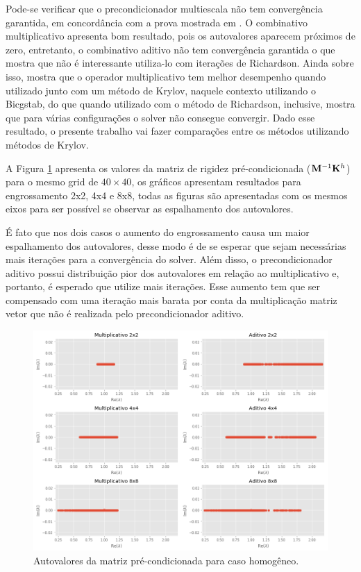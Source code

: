 Pode-se verificar que o precondicionador multiescala não tem convergência garantida, em concordância com a prova mostrada em \cite{zhouiterativo}. O combinativo multiplicativo apresenta bom resultado, pois os autovalores aparecem próximos de zero, entretanto, o combinativo aditivo não tem convergência garantida o que mostra que não é interessante utiliza-lo com iterações de Richardson. Ainda sobre isso, \cite{casteletto} mostra que o operador multiplicativo tem melhor desempenho quando utilizado junto com um método de Krylov, naquele contexto utilizando o Bicgstab, do que quando utilizado com o método de Richardson, inclusive, mostra que para várias configurações o solver não consegue convergir. Dado esse resultado, o presente trabalho vai fazer comparações entre os métodos utilizando métodos de Krylov. 

A Figura \ref{fig:autovaloresMatrizPrecon} apresenta os valores da matriz de rigidez pré-condicionada ($\mathbf{M}^{-1} \mathbf{K}^h$) para o mesmo grid de $40 \times 40$, os gráficos apresentam  resultados para engrossamento 2x2, 4x4 e 8x8, todas as figuras são apresentadas com os mesmos eixos para ser possível se observar as espalhamento dos autovalores.

É fato que nos dois casos o aumento do engrossamento causa um maior espalhamento dos autovalores, desse modo é de se esperar que sejam necessárias mais iterações para a convergência do solver. Além disso, o precondicionador aditivo possui distribuição pior dos autovalores em relação ao multiplicativo e, portanto, é esperado que utilize mais iterações. Esse aumento tem que ser compensado com uma iteração mais barata por conta da multiplicação matriz vetor que não é realizada pelo precondicionador aditivo.


\begin{figure}[!htbp]
\centering
\includegraphics[width=\textwidth]{chap06/figs/AutovaloresMatPrecondicionada.png}
\caption{Autovalores da matriz pré-condicionada para caso homogêneo.}
\label{fig:autovaloresMatrizPrecon}
\end{figure}

